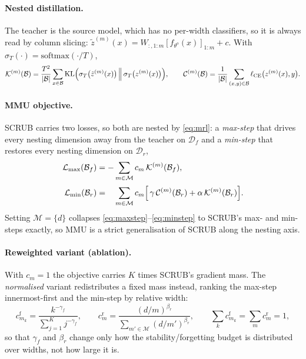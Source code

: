 \paragraph{Nested distillation.}
The teacher is the source model, which has no per-width classifiers, so it is
always read by column slicing: $\tilde z^{(m)}(x) = W_{:,1:m}
[f_{\theta^{o}}(x)]_{1:m} + c$. With $\sigma_T(\cdot) = \mathrm{softmax}(\cdot/T)$,
\begin{equation}
  \mathcal{K}^{(m)}(\mathcal{B})
  = \frac{T^{2}}{|\mathcal{B}|} \sum_{x \in \mathcal{B}}
    \mathrm{KL}\Bigl( \sigma_T\bigl(\tilde z^{(m)}(x)\bigr) \,\Big\|\,
                      \sigma_T\bigl(z^{(m)}(x)\bigr) \Bigr),
  \qquad
  \mathcal{C}^{(m)}(\mathcal{B})
  = \frac{1}{|\mathcal{B}|} \sum_{(x,y) \in \mathcal{B}}
    \ell_{\mathrm{CE}}\bigl(z^{(m)}(x), y\bigr).
  \label{eq:terms}
\end{equation}

\paragraph{MMU objective.}
SCRUB carries two losses, so both are nested by \eqref{eq:mrl}: a \emph{max-step}
that drives every nesting dimension away from the teacher on $\mathcal{D}_f$ and
a \emph{min-step} that restores every nesting dimension on $\mathcal{D}_r$,
\begin{align}
  \mathcal{L}_{\mathrm{max}}(\mathcal{B}_f)
    &= -\sum_{m \in \mathcal{M}} c_m \, \mathcal{K}^{(m)}(\mathcal{B}_f),
    \label{eq:maxstep}\\[2pt]
  \mathcal{L}_{\mathrm{min}}(\mathcal{B}_r)
    &= \phantom{-}\sum_{m \in \mathcal{M}} c_m
       \Bigl[\, \gamma \, \mathcal{C}^{(m)}(\mathcal{B}_r)
              + \alpha \, \mathcal{K}^{(m)}(\mathcal{B}_r) \Bigr].
    \label{eq:minstep}
\end{align}
Setting $\mathcal{M} = \{d\}$ collapses \eqref{eq:maxstep}--\eqref{eq:minstep}
to SCRUB's max- and min-steps exactly, so MMU is a strict generalisation of
SCRUB along the nesting axis.

\paragraph{Reweighted variant (ablation).}
With $c_m = 1$ the objective carries $K$ times SCRUB's gradient mass. The
\emph{normalised} variant redistributes a fixed mass instead, ranking the
max-step innermost-first and the min-step by relative width:
\begin{equation}
  c^{\mathrm{f}}_{m_k} = \frac{k^{-\gamma_f}}{\sum_{j=1}^{K} j^{-\gamma_f}},
  \qquad
  c^{\mathrm{r}}_{m} = \frac{(d/m)^{\beta_r}}{\sum_{m' \in \mathcal{M}} (d/m')^{\beta_r}},
  \qquad
  \textstyle\sum_k c^{\mathrm{f}}_{m_k} = \sum_m c^{\mathrm{r}}_{m} = 1,
  \label{eq:weights}
\end{equation}
so that $\gamma_f$ and $\beta_r$ change only how the stability/forgetting budget
is distributed over widths, not how large it is.

